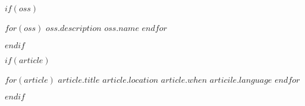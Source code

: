 \documentclass[$fontSize$, $format$]{awesome-cv}
\begin{document}
$if(oss)$
\begin{cventries}
    $for(oss)$
    \cventry
        {$oss.description$}
        {\href{$oss.url$}{$oss.name$}}
        {}
        {}
        {}
    $endfor$
\end{cventries}
$endif$

$if(article)$
\begin{cventries}
    $for(article)$
    \cventry
        {$article.title$}
        {$article.location$}
        {$article.when$}
        {$articile.language$}
        {}
    $endfor$
\end{cventries}
$endif$
\end{document}
